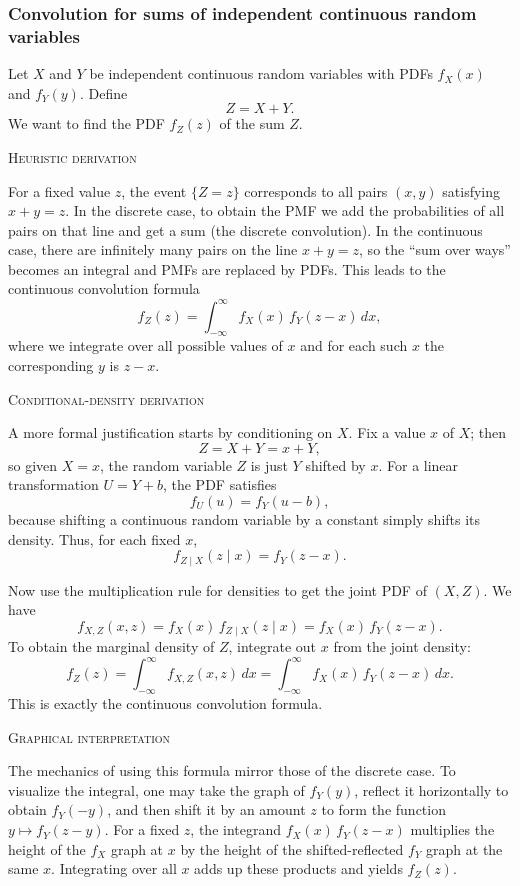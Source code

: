 \subsubsection{Convolution for sums of independent continuous random variables}

Let \(X\) and \(Y\) be independent continuous random variables with PDFs \(f_X(x)\) and \(f_Y(y)\).  
Define
\[
Z = X + Y.
\]
We want to find the PDF \(f_Z(z)\) of the sum \(Z\).

\textsc{Heuristic derivation}

For a fixed value \(z\), the event \(\{Z = z\}\) corresponds to all pairs \((x,y)\) satisfying \(x + y = z\).  
In the discrete case, to obtain the PMF we add the probabilities of all pairs on that line and get a sum (the discrete convolution).  
In the continuous case, there are infinitely many pairs on the line \(x+y=z\), so the “sum over ways” becomes an integral and PMFs are replaced by PDFs.  
This leads to the continuous convolution formula
\[
f_Z(z)
=
\int_{-\infty}^{\infty} f_X(x)\,f_Y(z-x)\,dx,
\]
where we integrate over all possible values of \(x\) and for each such \(x\) the corresponding \(y\) is \(z-x\).

\textsc{Conditional-density derivation}

A more formal justification starts by conditioning on \(X\).  
Fix a value \(x\) of \(X\); then
\[
Z = X + Y = x + Y,
\]
so given \(X=x\), the random variable \(Z\) is just \(Y\) shifted by \(x\).  
For a linear transformation \(U = Y + b\), the PDF satisfies
\[
f_U(u) = f_Y(u-b),
\]
because shifting a continuous random variable by a constant simply shifts its density.  
Thus, for each fixed \(x\),
\[
f_{Z\mid X}(z\mid x)
=
f_Y(z-x).
\]

Now use the multiplication rule for densities to get the joint PDF of \((X,Z)\).  
We have
\[
f_{X,Z}(x,z)
=
f_X(x)\,f_{Z\mid X}(z\mid x)
=
f_X(x)\,f_Y(z-x).
\]
To obtain the marginal density of \(Z\), integrate out \(x\) from the joint density:
\[
f_Z(z)
=
\int_{-\infty}^{\infty} f_{X,Z}(x,z)\,dx
=
\int_{-\infty}^{\infty} f_X(x)\,f_Y(z-x)\,dx.
\]
This is exactly the continuous convolution formula.

\bigskip
\textsc{Graphical interpretation}

The mechanics of using this formula mirror those of the discrete case.  
To visualize the integral, one may take the graph of \(f_Y(y)\), reflect it horizontally to obtain \(f_Y(-y)\), and then shift it by an amount \(z\) to form the function \(y \mapsto f_Y(z-y)\).  
For a fixed \(z\), the integrand \(f_X(x)\,f_Y(z-x)\) multiplies the height of the \(f_X\) graph at \(x\) by the height of the shifted-reflected \(f_Y\) graph at the same \(x\).  
Integrating over all \(x\) adds up these products and yields \(f_Z(z)\).


